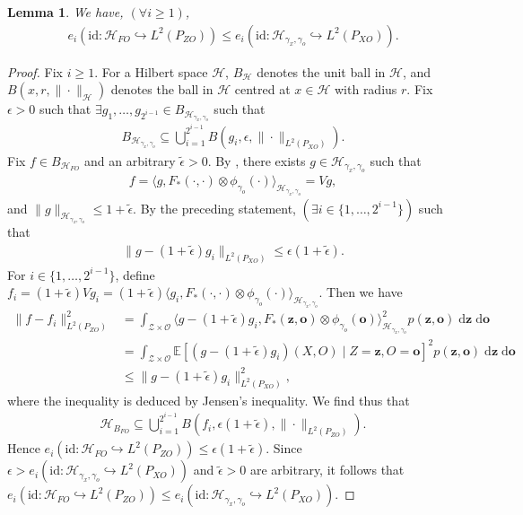\documentclass[11pt]{article}
\newcommand{\bz}{\mathbf z}
\newcommand{\bo}{\mathbf o}
\newcommand{\calZ}{\mathcal{Z}}
\newcommand{\calH}{\mathcal{H}}
\newcommand{\calO}{\mathcal{O}}
\newcommand{\0}{\mathbf{0}}
\newtheorem{lem}{Lemma}[section]
\begin{document}
\begin{appendix}
\begin{lem}
\label{lem:reduced_rkhs_entropy}
    We have, $(\forall i\geq 1)$, 
    \begin{align*}
        e_i(\mathrm{id}: \calH_{FO} \hookrightarrow L^2(P_{ZO})) \leq e_i(\mathrm{id}:\calH_{\gamma_x,\gamma_o}\hookrightarrow L^2(P_{XO})).
    \end{align*}
\end{lem}
\begin{proof}
Fix $i\geq 1$. For a Hilbert space $\calH$, $B_{\calH}$ denotes the unit ball in $\calH$, and $B(x, r, \|\cdot \|_{\calH})$ denotes the ball in $\calH$ centred at $x\in\calH$ with radius $r$. Fix $\epsilon>0$ such that $\exists g_1, \dots, g_{2^{i-1}} \in B_{\calH_{\gamma_x,\gamma_o}}$ such that 
\begin{align*}
    B_{\calH_{\gamma_x,\gamma_o}} \subseteq \bigcup_{i=1}^{2^{i-1}}B\left(g_i, \epsilon, \|\cdot \|_{L^2(P_{XO})}\right).
\end{align*}
Fix $f\in B_{\calH_{FO}}$ and an arbitrary $\tilde{\epsilon}>0$. By \citet[Eq. (4.11)]{steinwart2008support}, there exists $g\in \calH_{\gamma_x,\gamma_o}$ such that 
\begin{align*}
    f = \langle g, F_{\ast}(\cdot, \cdot)\otimes \phi_{\gamma_o}(\cdot)\rangle_{\calH_{\gamma_x,\gamma_o}} = Vg,
\end{align*}
and $\|g\|_{\calH_{\gamma_x,\gamma_o}}\leq 1 + \tilde{\epsilon}$. By the preceding statement, $(\exists i\in \{1,\dots, 2^{i-1}\})$ such that 
\begin{align*}
    \|g - (1+\tilde{\epsilon})g_i\|_{L^2(P_{XO})}\leq \epsilon(1 + \tilde{\epsilon}).
\end{align*}
For $i\in \{1,\dots, 2^{i-1}\}$, define $f_i = (1+\tilde{\epsilon})Vg_i = (1+\tilde{\epsilon})\langle g_i, F_{\ast}(\cdot, \cdot)\otimes \phi_{\gamma_o}(\cdot)\rangle_{\calH_{\gamma_x,\gamma_o}}$. Then we have
\begin{align*}
    \|f - f_i\|^2_{L^2(P_{ZO})} &= \int_{\calZ\times \calO}\langle g - (1+\tilde{\epsilon})g_i, F_{\ast}(\bz,\bo)\otimes \phi_{\gamma_o}(\bo)\rangle_{\calH_{\gamma_x,\gamma_o}}^2p(\bz,\bo)\;\mathrm{d}\bz\;\mathrm{d}\bo\\
    &= \int_{\calZ\times \calO}\mathbb{E}[(g-(1+\tilde{\epsilon})g_i)(X,O)\mid Z = \bz,O = \bo]^2p(\bz,\bo)\;\mathrm{d}\bz\;\mathrm{d}\bo\\
    &\leq \|g - (1+\tilde{\epsilon}) g_i\|^2_{L^2(P_{XO})},
\end{align*}
where the inequality is deduced by Jensen's inequality. We find thus that 
\begin{align*}
    \calH_{B_{FO}}\subseteq \bigcup_{i=1}^{2^{i-1}}B(f_i, \epsilon(1+\tilde{\epsilon}), \|\cdot\|_{L^2(P_{ZO})}).
\end{align*}
Hence $e_i(\mathrm{id}: \calH_{FO}\hookrightarrow L^2(P_{ZO})) \leq \epsilon(1+\tilde{\epsilon})$. Since $\epsilon > e_i(\mathrm{id}:\calH_{\gamma_x,\gamma_o}\hookrightarrow L^2(P_{XO}))$ and $\tilde{\epsilon}>0$ are arbitrary, it follows that $e_i(\mathrm{id}:\calH_{FO}\hookrightarrow L^2(P_{ZO}))\leq e_i(\mathrm{id}:\calH_{\gamma_x,\gamma_o}\hookrightarrow L^2(P_{XO}))$.
\end{proof}


\end{appendix}
\end{document}
